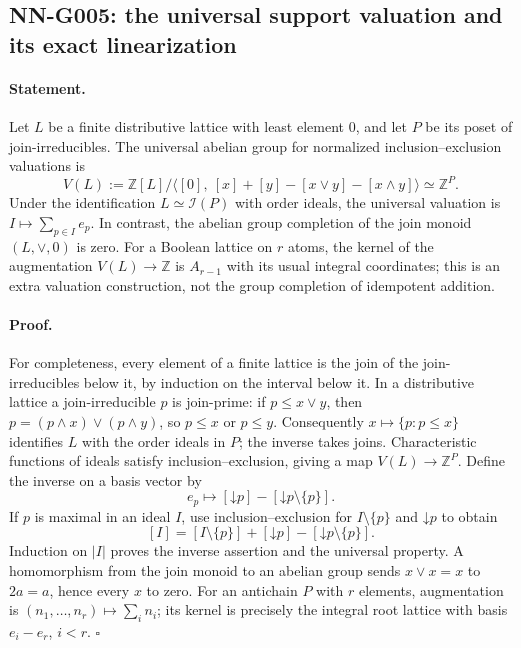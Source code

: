\subsection{NN-G005: the universal support valuation and its exact linearization}
\paragraph{Statement.}
Let $L$ be a finite distributive lattice with least element $0$,
and let $P$ be its poset of join-irreducibles. The universal abelian
group for normalized inclusion--exclusion valuations is
\[
 V(L):=\mathbb Z[L]/\langle[0],\ [x]+[y]-[x\vee y]-[x\wedge y]\rangle
 \simeq\mathbb Z^P.                                      \tag{G005.1}
\]
Under the identification $L\simeq\mathcal I(P)$ with order ideals,
the universal valuation is $I\mapsto\sum_{p\in I}e_p$.
In contrast, the abelian group completion of the join monoid
$(L,\vee,0)$ is zero. For a Boolean lattice on $r$ atoms,
the kernel of the augmentation $V(L)\to\mathbb Z$ is $A_{r-1}$
with its usual integral coordinates; this is an extra valuation
construction, not the group completion of idempotent addition.

\paragraph{Proof.}
For completeness, every element of a finite lattice is the join
of the join-irreducibles below it, by induction on the interval
below it. In a distributive lattice a join-irreducible $p$ is
join-prime: if $p\le x\vee y$, then
$p=(p\wedge x)\vee(p\wedge y)$, so $p\le x$ or $p\le y$.
Consequently $x\mapsto\{p:p\le x\}$ identifies $L$ with the
order ideals in $P$; the inverse takes joins. Characteristic
functions of ideals satisfy inclusion--exclusion, giving a map
$V(L)\to\mathbb Z^P$. Define the inverse on a basis vector by
\[
 e_p\longmapsto[\mathord\downarrow p]
                    -[\mathord\downarrow p\setminus\{p\}].
\]
If $p$ is maximal in an ideal $I$, use inclusion--exclusion for
$I\setminus\{p\}$ and $\mathord\downarrow p$ to obtain
\[
 [I]=[I\setminus\{p\}]+[\mathord\downarrow p]
              -[\mathord\downarrow p\setminus\{p\}].
\]
Induction on $|I|$ proves the inverse assertion and the universal
property. A homomorphism from the join monoid to an abelian group
sends $x\vee x=x$ to $2a=a$, hence every $x$ to zero.
For an antichain $P$ with $r$ elements, augmentation is
$(n_1,\ldots,n_r)\mapsto\sum_i n_i$; its kernel is precisely the
integral root lattice with basis $e_i-e_r$, $i<r$.
\hfill$\square$

